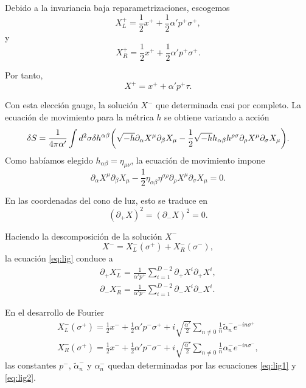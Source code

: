 Debido a la invariancia baja reparametrizaciones, escogemos
\begin{equation}
  X^+_L=\frac 1 2 x^+ + \frac 1 2 \alpha' p^+ \sigma^+,
\end{equation}
y
\begin{equation}
  X^+_R=\frac 1 2 x^+ + \frac 1 2 \alpha' p^+ \sigma^+.
\end{equation}

Por tanto, 
\begin{equation}
  X^+ = x^+ + \alpha' p^+ \tau.
\end{equation}

Con esta elección gauge, la solución $X^-$ que determinada casi por completo.
La ecuación de movimiento para la métrica $h$ se obtiene variando a acción
\begin{equation}
  \delta S = \frac{1}{4\pi\alpha'}\int d^2\sigma \delta h^{\alpha\beta}
  \qty(
  \sqrt{-h}\partial_\alpha X^\mu \partial_\beta X_\mu -
  \frac 1 2 \sqrt{-h}h_{\alpha\beta}h^{\rho\sigma} \partial_\rho X^\mu \partial_\sigma X_\mu).
\end{equation}
Como habíamos elegido $h_{\alpha\beta}=\eta_{\mu\nu}$, la ecuación de movimiento impone
\begin{equation}
  \partial_\alpha X^\mu \partial_\beta X_\mu - \frac 1 2 \eta_{\alpha\beta} \eta^{\sigma\rho} 
  \partial_\rho X^\mu  \partial_\sigma X_\mu = 0.
\end{equation}

En las coordenadas del cono de luz, esto se traduce en
\begin{equation}
  (\partial_+ X)^2 = (\partial_- X)^2 = 0.
  \label{eq:lig}
\end{equation}

Haciendo la descomposición de la solución $X^-$ 
\begin{equation}
  X^-=X^-_L(\sigma^+)+X^-_R(\sigma^-),
\end{equation}
la ecuación \ref{eq:lig} conduce a 
  \begin{align}
    \partial_+ X_L^- = \frac{1}{\alpha'p^+}\sum_{i=1}^{D-2} \partial_+ X^i \partial_+ X^i, \label{eq:lig1}\\
    \partial_- X_R^- = \frac{1}{\alpha'p^-}\sum_{i=1}^{D-2} \partial_- X^i \partial_- X^i. \label{eq:lig2}
  \end{align}

En el desarrollo de Fourier
\begin{equation}
  \begin{gathered}
    X^-_L(\sigma^+)=\frac 1 2 x^- + \frac 1 2 \alpha' p^- \sigma^+ + i\sqrt{\frac{ \alpha'}{ 2}}
    \sum_{n\neq0} \frac 1 n \tilde{\alpha}^-_n e^{-in\sigma^+} \\                             
    X^-_R(\sigma^+)=\frac 1 2 x^- + \frac 1 2 \alpha' p^- \sigma^- + i\sqrt{\frac{ \alpha'}{ 2}}
    \sum_{n\neq0} \frac 1 n \alpha^-_n e^{-in\sigma^-},
  \end{gathered}
\end{equation}
las constantes $p^-$, $\tilde \alpha^-_n$ y $\alpha^-_n$ quedan determinadas por las ecuaciones
\ref{eq:lig1} y \ref{eq:lig2}.

